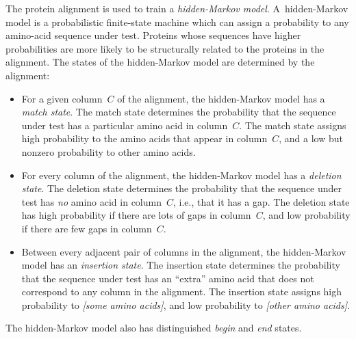 \documentclass[preprint,nonatbib,blockstyle,nocopyrightspace,times]{sigplanconf}
\begin{document}
The protein alignment is used to train a \emph{hidden-Markov model}.
A~hidden-Markov model is a probabilistic finite-state machine which 
can assign a probability to any amino-acid sequence under test.
Proteins whose sequences have higher probabilities are more likely to
be structurally related to the proteins in the alignment.
The states of the hidden-Markov model are determined by the alignment:
\begin{itemize}
\item
For a given column~$C$ of the alignment, the hidden-Markov model has a
\emph{match state}.
The match state determines the probability that the sequence under
test has a particular amino acid in column~$C$.
The match state assigns high probability to the amino acids that
appear in column~$C$, and a low but nonzero probability to other amino
acids.
\item
For every column of the alignment, the hidden-Markov model has a
\emph{deletion state}.
The deletion state determines the probability that the sequence under
test has \emph{no} amino acid  in column~$C$, i.e., that it has a gap.
The deletion state has high probability if there are lots of gaps in
column~$C$,
and low probability if there are few gaps in column~$C$.
\item
Between every adjacent pair of columns in the alignment,
the hidden-Markov model has an
\emph{insertion state}.
The insertion state determines the probability that the sequence under
test has an ``extra'' amino acid that does not correspond to any
column in the alignment.
The insertion state assigns high probability to \emph{[some amino
    acids]}, and low probability to \emph{[other amino acids]}.
\end{itemize}
The hidden-Markov model also has distinguished \emph{begin} and \emph{end} states.
\end{document}
